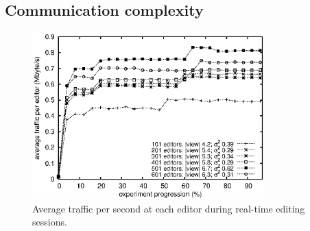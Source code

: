 
\subsection{Communication complexity}

\begin{figure}
  \centering
  \includegraphics[width=0.8\textwidth]{./img/communication.eps}
  \caption{\label{fig:traffic} Average traffic per second at each editor during
    real-time editing sessions.}
\end{figure}

